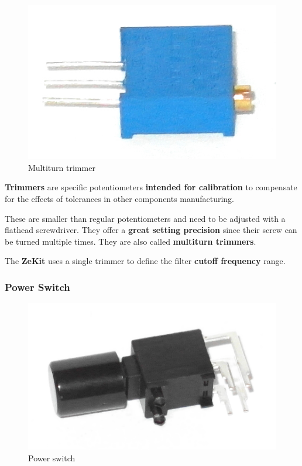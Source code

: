 \documentclass{scrartcl}
\begin{document}
\begin{figure}[!ht]
    \begin{center}
        \includegraphics[scale=0.20]{assets/zekit-trimmer.jpg}
        \caption{Multiturn trimmer}
    \end{center}
\end{figure}

\textbf{Trimmers} are specific potentiometers \textbf{intended for calibration} to compensate for the effects of tolerances in other components manufacturing.

These are smaller than regular potentiometers and need to be adjusted with a flathead screwdriver. They offer a \textbf{great setting precision} since their screw can be turned multiple times. They are also called \textbf{multiturn trimmers}.

The \textbf{ZeKit} uses a single trimmer to define the filter \textbf{cutoff frequency} range.

\subsubsection{Power Switch}

\begin{figure}[!ht]
    \begin{center}
        \includegraphics[scale=0.18]{assets/zekit-power.jpg}
        \caption{Power switch}
    \end{center}
\end{figure}
\end{document}
